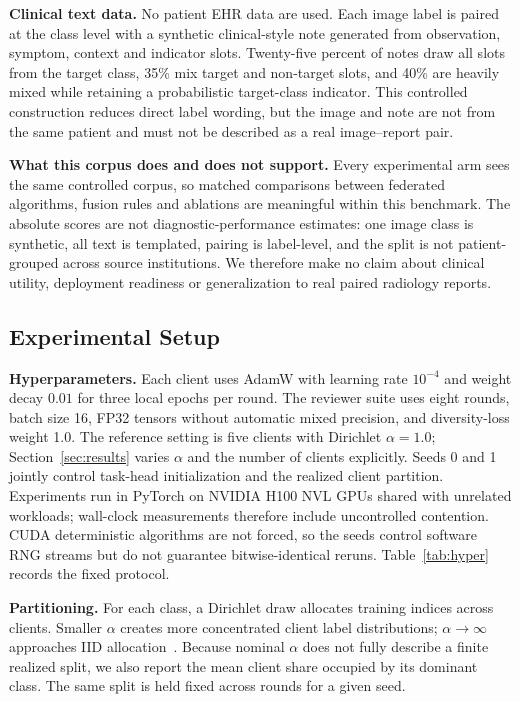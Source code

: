 \documentclass[letterpaper, conference]{IEEEtran}
\begin{document}
\textbf{Clinical text data.}
No patient EHR data are used. Each image label is paired at the class level with a
synthetic clinical-style note generated from observation, symptom, context and
indicator slots. Twenty-five percent of notes draw all slots from the target
class, 35\% mix target and non-target slots, and 40\% are heavily mixed while
retaining a probabilistic target-class indicator. This controlled construction
reduces direct label wording, but the image and note are not from the same patient
and must not be described as a real image--report pair.

\label{sec:corpus}
\textbf{What this corpus does and does not support.}
Every experimental arm sees the same controlled corpus, so matched comparisons
between federated algorithms, fusion rules and ablations are meaningful within
this benchmark. The absolute scores are not diagnostic-performance estimates:
one image class is synthetic, all text is templated, pairing is label-level, and
the split is not patient-grouped across source institutions. We therefore make no
claim about clinical utility, deployment readiness or generalization to real
paired radiology reports.

\subsection{Experimental Setup}

\textbf{Hyperparameters.}
Each client uses AdamW with learning rate $10^{-4}$ and weight decay $0.01$ for
three local epochs per round. The reviewer suite uses eight rounds, batch size 16,
FP32 tensors without automatic mixed precision, and diversity-loss weight 1.0. The reference setting is five
clients with Dirichlet $\alpha=1.0$; Section~\ref{sec:results} varies $\alpha$
and the number of clients explicitly. Seeds 0 and 1 jointly control
task-head initialization and the realized client partition. Experiments run in
PyTorch on NVIDIA H100 NVL GPUs shared with unrelated workloads; wall-clock
measurements therefore include uncontrolled contention. CUDA deterministic
algorithms are not forced, so the seeds control software RNG streams but do not
guarantee bitwise-identical reruns. Table~\ref{tab:hyper} records the fixed protocol.

\textbf{Partitioning.}
For each class, a Dirichlet draw allocates training indices across clients.
Smaller $\alpha$ creates more concentrated client label distributions;
$\alpha\!\to\!\infty$ approaches IID allocation~\cite{Hsu2019}. Because nominal $\alpha$ does
not fully describe a finite realized split, we also report the mean client share
occupied by its dominant class. The same split is held fixed across rounds for a
given seed.
\end{document}
